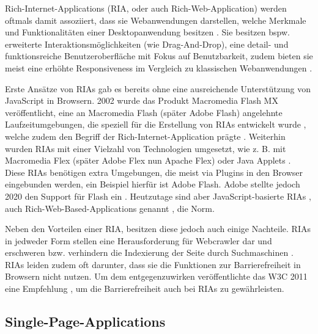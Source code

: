 
Rich-Internet-Applications (RIA, oder auch Rich-Web-Application) werden oftmals damit assoziiert, dass sie Webanwendungen darstellen, welche Merkmale und Funktionalitäten einer Desktopanwendung besitzen \cite{TenYearsOfRIAs} \cite{NecessityOfMethodologiesToModelRIAs}. Sie besitzen bspw. erweiterte Interaktionsmöglichkeiten (wie Drag-And-Drop), eine detail- und funktionsreiche Benutzeroberfläche mit Fokus auf Benutzbarkeit, zudem bieten sie meist eine erhöhte Responsiveness im Vergleich zu klassischen Webanwendungen \cite{TenYearsOfRIAs}.

Erste Ansätze von RIAs gab es bereits ohne eine ausreichende Unterstützung von JavaScript in Browsern. 2002 wurde das Produkt Macromedia Flash MX veröffentlicht, eine an Macromedia Flash (später Adobe Flash) angelehnte Laufzeitumgebungen, die speziell für die Erstellung von RIAs entwickelt wurde \cite{MacromediaFlashMXWhitePaper}, welche zudem den Begriff der Rich-Internet-Application prägte \cite{TenYearsOfRIAs}. Weiterhin wurden RIAs mit einer Vielzahl von Technologien umgesetzt, wie z. B. mit Macromedia Flex (später Adobe Flex nun Apache Flex) oder Java Applets \cite{NecessityOfMethodologiesToModelRIAs} \cite{RIAsTheNextStageOfApplicationDevelopment} \cite{RichInternetApplications} \cite{FinkIntroducingSPAs}. Diese RIAs benötigen extra Umgebungen, die meist via Plugins in den Browser eingebunden werden, ein Beispiel hierfür ist Adobe Flash. Adobe stellte jedoch 2020 den Support für Flash ein \cite{Netlytic}. Heutzutage sind aber JavaScript-basierte RIAs \cite{RIAsTheNextStageOfApplicationDevelopment}, auch Rich-Web-Based-Applications genannt \cite{RichWebBasedApplications} \cite{Netlytic}, die Norm. 

Neben den Vorteilen einer RIA, besitzen diese jedoch auch einige Nachteile. RIAs in jedweder Form stellen eine Herausforderung für Webcrawler dar und erschweren bzw. verhindern die Indexierung der Seite durch Suchmaschinen \cite{CrawlingRIAs}. RIAs leiden zudem oft darunter, dass sie die Funktionen zur Barrierefreiheit in Browsern nicht nutzen. Um dem entgegenzuwirken veröffentlichte das W3C 2011 eine Empfehlung \cite{W3CAccessibleRIAs}, um die Barrierefreiheit auch bei RIAs zu gewährleisten.

\subsection{Single-Page-Applications}
\label{sec:single-page-applications}

